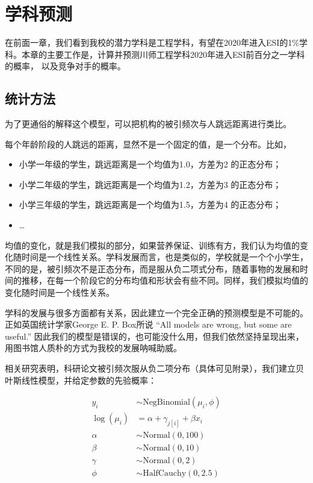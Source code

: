 \documentclass[cn, 11pt, fancy, hide]{elegantbook}
\providecommand{\tightlist}{%
  \setlength{\itemsep}{0pt}\setlength{\parskip}{0pt}}
\begin{document}
\hypertarget{predict}{%
\chapter{学科预测}\label{predict}}

在前面一章，我们看到我校的潜力学科是工程学科，有望在2020年进入ESI的1\%学科。本章的主要工作是，计算并预测川师工程学科2020年进入ESI前百分之一学科的概率， 以及竞争对手的概率。

\hypertarget{ux7edfux8ba1ux65b9ux6cd5}{%
\section{统计方法}\label{ux7edfux8ba1ux65b9ux6cd5}}

为了更通俗的解释这个模型，可以把机构的被引频次与人跳远距离进行类比。

每个年龄阶段的人跳远的距离，显然不是一个固定的值，是一个分布。比如，

\begin{itemize}
\tightlist
\item
  小学一年级的学生，跳远距离是一个均值为1.0，方差为2 的正态分布；
\item
  小学二年级的学生，跳远距离是一个均值为1.2，方差为3 的正态分布；
\item
  小学三年级的学生，跳远距离是一个均值为1.5，方差为4 的正态分布；
\item
  \ldots{}
\end{itemize}

均值的变化，就是我们模拟的部分，如果营养保证、训练有方，我们认为均值的变化随时间是一个线性关系。学科发展而言，也是类似的，学校就是一个个小学生，不同的是，被引频次不是正态分布，而是服从负二项式分布，随着事物的发展和时间的推移，在每一个阶段它的分布均值和形状会有些不同。同样，我们模拟均值的变化随时间是一个线性关系。

学科的发展与很多方面都有关系，因此建立一个完全正确的预测模型是不可能的。正如英国统计学家George E. P. Box所说 ``All models are wrong, but some are useful.'' 因此我们的模型是错误的，也可能没什么用，但我们依然坚持呈现出来，用图书馆人质朴的方式为我校的发展呐喊助威。

相关研究表明，科研论文被引频次服从负二项分布（具体可见附录），我们建立贝叶斯线性模型，并给定参数的先验概率：

\begin{align*}
y_i & \sim \text{NegBinomial}(\mu_i, \phi) \\
\log(\mu_i) & = \alpha + \gamma_{j[i]} + \beta x_i \\
\alpha & \sim \text{Normal}(0, 100) \\
\beta & \sim \text{Normal}(0, 10)  \\
\gamma & \sim \text{Normal}(0, 2)  \\
\phi & \sim \text{HalfCauchy}(0, 2.5)
\end{align*}
\end{document}
